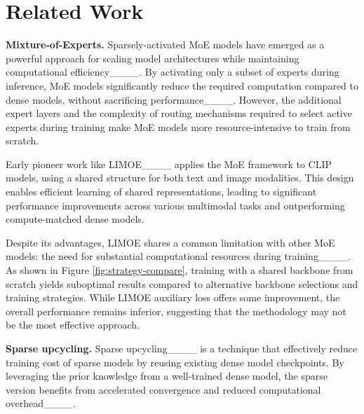 \section{Related Work}
\label{related-work}

\textbf{Mixture-of-Experts.} Sparsely-activated MoE models have emerged as a powerful approach for scaling model architectures while maintaining computational efficiency____. By activating only a subset of experts during inference, MoE models significantly reduce the required computation compared to dense models, without sacrificing performance____. However, the additional expert layers and the complexity of routing mechanisms required to select active experts during training make MoE models more resource-intensive to train from scratch.

Early pioneer work like LIMOE____ applies the MoE framework to CLIP models, using a shared structure for both text and image modalities. This design enables efficient learning of shared representations, leading to significant performance improvements across various multimodal tasks and outperforming compute-matched dense models.

Despite its advantages, LIMOE shares a common limitation with other MoE models: the need for substantial computational resources during training____. 
As shown in Figure \ref{fig:strategy-compare}, training with a shared backbone from scratch yields suboptimal results compared to alternative backbone selections and training strategies. While LIMOE auxiliary loss offers some improvement, the overall performance remains inferior, suggesting that the methodology may not be the most effective approach.


\textbf{Sparse upcycling.} Sparse upcycling____ is a technique that effectively reduce training cost of sparse models by reusing existing dense model checkpoints. By leveraging the prior knowledge from a well-trained dense model, the sparse version benefits from accelerated convergence and reduced computational overhead____.

